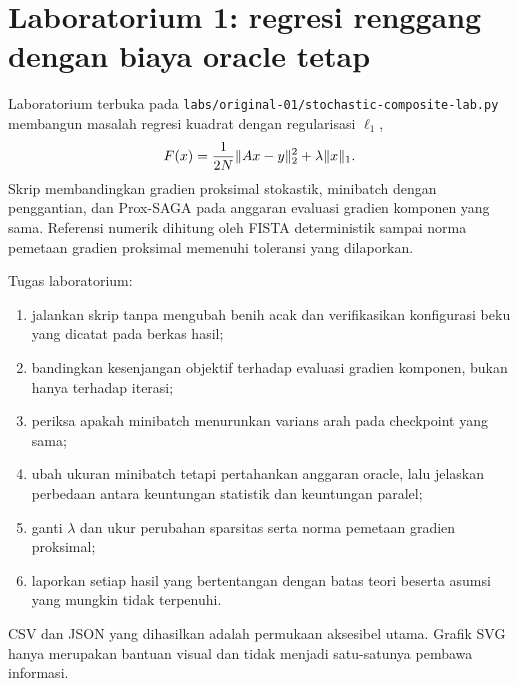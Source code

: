 \section{Laboratorium 1: regresi renggang dengan biaya oracle tetap}
\label{orig01:section:lab}

Laboratorium terbuka pada
\texttt{labs/original-01/stochastic-composite-lab.py} membangun masalah
regresi kuadrat dengan regularisasi $\ell_1$,
\begin{equation}
  \label{orig01:eq:lab-objective}
  F(x)=\frac{1}{2N}\|Ax-y\|_2^2+\lambda\|x\|_1.
\end{equation}
Skrip membandingkan gradien proksimal stokastik, minibatch dengan penggantian,
dan Prox-SAGA pada anggaran evaluasi gradien komponen yang sama. Referensi
numerik dihitung oleh FISTA deterministik sampai norma pemetaan gradien
proksimal memenuhi toleransi yang dilaporkan.

Tugas laboratorium:
\begin{enumerate}
  \item jalankan skrip tanpa mengubah benih acak dan verifikasikan konfigurasi
    beku yang dicatat pada berkas hasil;
  \item bandingkan kesenjangan objektif terhadap evaluasi gradien komponen,
    bukan hanya terhadap iterasi;
  \item periksa apakah minibatch menurunkan varians arah pada checkpoint yang
    sama;
  \item ubah ukuran minibatch tetapi pertahankan anggaran oracle, lalu
    jelaskan perbedaan antara keuntungan statistik dan keuntungan paralel;
  \item ganti $\lambda$ dan ukur perubahan sparsitas serta norma pemetaan
    gradien proksimal;
  \item laporkan setiap hasil yang bertentangan dengan batas teori beserta
    asumsi yang mungkin tidak terpenuhi.
\end{enumerate}
CSV dan JSON yang dihasilkan adalah permukaan aksesibel utama. Grafik SVG
hanya merupakan bantuan visual dan tidak menjadi satu-satunya pembawa
informasi.

